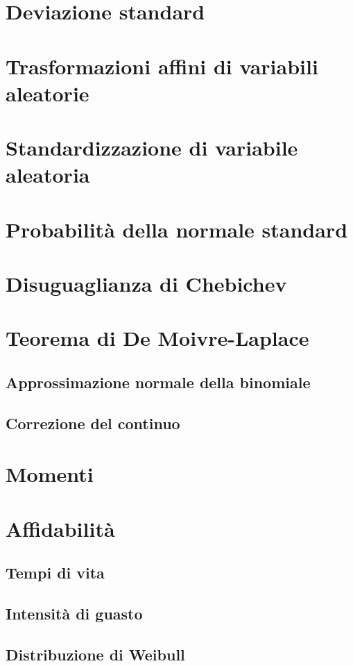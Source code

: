     \section{Deviazione standard}
        \begin{defn}
            
        \end{defn}
    \section{Trasformazioni affini di variabili aleatorie}
    \section{Standardizzazione di variabile aleatoria}
    \section{Probabilità della normale standard}
    \section{Disuguaglianza di Chebichev}
    \section{Teorema di De Moivre-Laplace}
        \subsection{Approssimazione normale della binomiale}
        \subsection*{Correzione del continuo}
    \section{Momenti}
    \section{Affidabilità}
        \subsection{Tempi di vita}
        \subsection{Intensità di guasto}
        \subsection{Distribuzione di Weibull}
